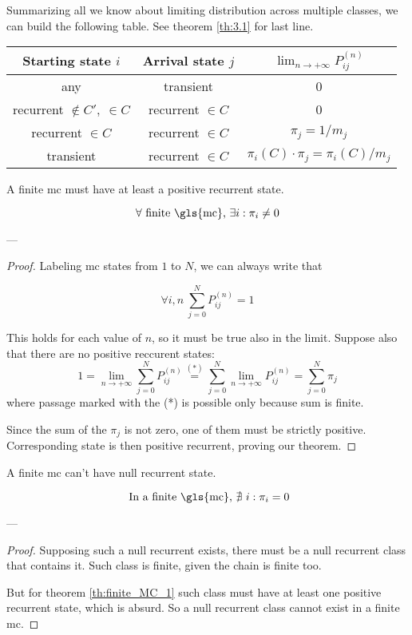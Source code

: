	Summarizing all we know about limiting distribution across multiple classes, we can build the following table.
	See theorem \ref{th:3.1} for last line.
	\begin{center}\begin{tabular}{c|c|c}
		Starting state $i$ & Arrival state $j$ & $\lim_{n \to +\infty} P_{ij}^{(n)}$ \\ \hline
		any & transient & 0 \\
		recurrent $\notin C' ,\: \in C$ & recurrent $\in C$ & 0 \\
		recurrent $\in C$ & recurrent $\in C$ & $\pi_j = 1 / m_j$ \\
		transient & recurrent $\in C$ & $\pi_i(C)\cdot\pi_j = \pi_i(C) / m_j$ \\
	\end{tabular}\end{center}

	\begin{theorem} \label{th:finite_MC_1}
		A finite \gls{mc} must have at least a positive recurrent state.

		$$ \forall \text{ finite \gls{mc}, } \exists i: \pi_i \neq 0 $$
	\end{theorem}
	---
	\begin{proof}
		Labeling \gls{mc} states from $1$ to $N$, we can always write that

		$$ \forall i, n ~ \sum_{j=0}^N P_{ij}^{(n)} = 1$$

		This holds for each value of $n$, so it must be true also in the limit.
		Suppose also that there are no positive reccurent states:
		$$ 1 = \lim_{n \to +\infty} \sum_{j=0}^N P_{ij}^{(n)} \stackrel{(*)}{=} \sum_{j=0}^N \lim_{n \to +\infty} P_{ij}^{(n)}
		= \sum_{j=0}^N \pi_j $$
		where passage marked with the (*) is possible only because sum is finite.

		Since the sum of the $\pi_j$ is not zero, one of them must be strictly positive.
		Corresponding state is then positive recurrent, proving our theorem.
	\end{proof}

	\begin{theorem}
		A finite \gls{mc} can't have null recurrent state.

		$$ \text{ In a finite \gls{mc}, } \nexists~ i: \pi_i = 0 $$
	\end{theorem}
	---
	\begin{proof}
		Supposing such a null recurrent exists, there must be a null recurrent class that contains it.
		Such class is finite, given the chain is finite too.

		But for theorem \ref{th:finite_MC_1} such class must have at least one positive recurrent state, which is absurd.
		So a null recurrent class cannot exist in a finite \gls{mc}.
	\end{proof}


